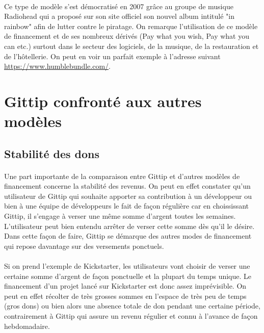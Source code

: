 \paragraph{}
Ce type de modèle s'est démocratisé en 2007 grâce au groupe de
musique Radiohead qui a proposé sur son site officiel son nouvel album intitulé
"in rainbow" afin de lutter contre le piratage. On remarque l'utilisation de ce
modèle de financement et de ses nombreux dérivés (Pay what you wish, Pay what
you can etc.) surtout dans le secteur des logiciels, de la musique, de la
restauration et de l'hôtellerie. On peut en voir un parfait exemple à l'adresse
suivant \url{https://www.humblebundle.com/}.


\section{Gittip confronté aux autres modèles}

\subsection{Stabilité des dons}

\paragraph{}
Une part importante de la comparaison entre Gittip et d'autres modèles de
financement concerne la stabilité des revenus. On peut en effet constater qu'un
utilisateur de Gittip qui souhaite apporter sa contribution à un développeur ou
bien à une équipe de développeurs le fait de façon régulière car en
choississant
Gittip, il s'engage à verser une même somme d'argent toutes les semaines.
L'utilisateur peut bien entendu arrêter de verser cette somme dès qu'il le
désire. Dans cette façon de faire, Gittip se démarque des autres modes de
financement qui repose davantage sur des versements ponctuels.

\paragraph{}
Si on prend l'exemple de Kickstarter, les utilisateurs vont choisir de verser
une certaine somme d'argent de façon ponctuelle et la plupart du temps unique.
Le financement d'un projet lancé sur Kickstarter est donc assez imprévisible.
On peut en effet récolter de très grosses sommes en l'espace de très peu de
temps
(gros dons) ou bien alors une absence totale de don pendant une certaine
période, contrairement à Gittip qui assure un revenu régulier et connu à
l'avance de façon hebdomadaire.

